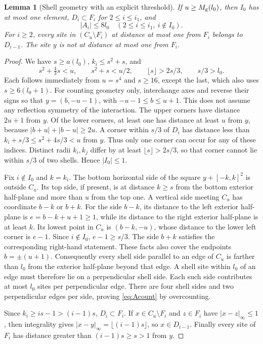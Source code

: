 \documentclass[11pt]{amsart}
\newtheorem{lemma}[theorem]{Lemma}
\theoremstyle{definition}
\newcommand{\1}{\mathbf 1}
\begin{document}
\begin{lemma}[Shell geometry with an explicit threshold]
\label{lem:geometry}
If $u\ge M_{\rm g}(l_0)$, then $I_0$ has at most one element,
$D_i\subset F_i$ for $2\le i\le i_1$, and
\begin{equation}\label{eq:Acount}
 |A_i|\le8l_0\quad(2\le i\le i_1,\ i\notin I_0).
\end{equation}
For $i\ge2$, every site in $(C_u\setminus F_i)$ at distance at most one
from $F_i$ belongs to $D_{i-1}$. The site $y$ is not at distance at most
one from $F_i$.
\end{lemma}
\begin{proof}
We have $s\ge a(l_0)$, $k_i\le s^2+s$, and
\[
 s^2+\tfrac43s<u,\qquad s^2+s<u/2,\qquad
 \lfloor s\rfloor>2s/3,\qquad s/3>l_0.
\]
Each follows immediately from $u=s^4$ and $s\ge16$, except the last,
which also uses $s\ge6(l_0+1)$.
For counting geometry only, interchange axes and reverse their signs so
that $y=(b,-u-1)$, with $-u-1\le b\le u+1$. This does not assume any
reflection symmetry of the interaction. The upper corners have distance
$2u+1$ from $y$. Of the lower corners, at least one has distance at least
$u$ from $y$, because $|b+u|+|b-u|\ge2u$. A corner within $s/3$ of
$D_i$ has distance less than $k_i+s/3\le s^2+4s/3<u$ from $y$.
Thus only one corner can occur for any of these indices. Distinct radii
$k_i,k_j$ differ by at least $\lfloor s\rfloor>2s/3$, so that corner
cannot lie within $s/3$ of two shells. Hence $|I_0|\le1$.

Fix $i\notin I_0$ and $k=k_i$. The bottom horizontal side of the square
$y+[-k,k]^2$ is outside $C_u$. Its top side, if present, is at distance
$k\ge s$ from the bottom exterior half-plane and more than $u$ from the
top one. A vertical side meeting $C_u$ has coordinate $b-k$ or $b+k$.
For the side $b-k$, its distance to the left exterior half-plane is
$e=b-k+u+1\ge1$, while its distance to the right exterior half-plane is
at least $k$. Its lowest point in $C_u$ is $(b-k,-u)$, whose distance
to the lower left corner is $e-1$. Since $i\notin I_0$,
$e-1\ge s/3$. The side $b+k$ satisfies the corresponding right-hand
statement. These facts also cover the endpoints $b=\pm(u+1)$.
Consequently every shell side parallel to an edge of $C_u$ is farther
than $l_0$ from the exterior half-plane beyond that edge. A shell site
within $l_0$ of an edge must therefore lie on a perpendicular shell side.
Each such side contributes at most $l_0$ sites per perpendicular edge.
There are four shell sides and two perpendicular edges per side, proving
\eqref{eq:Acount} by overcounting.

Since $k_i\ge is-1>(i-1)s$, $D_i\subset F_i$.
If $x\in C_u\setminus F_i$ and $z\in F_i$ have $|x-z|_\infty\le1$,
then integrality gives
$|x-y|_\infty=\lfloor(i-1)s\rfloor$, so $x\in D_{i-1}$.
Finally every site of $F_i$ has distance greater than
$(i-1)s\ge s>1$ from $y$.
\end{proof}
\end{document}
